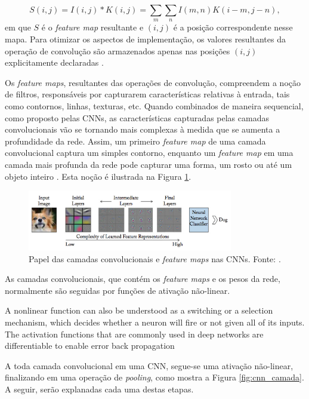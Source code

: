 \begin{equation}
 S(i,j) = I(i,j)*K(i,j) = \sum_{m}\sum_{n}I(m,n)K(i-m,j-n),\label{eq:conv_img}
\end{equation} em que $S$ é o \emph{feature map} resultante e $(i,j)$ é a posição correspondente nesse mapa. Para otimizar os aspectos de implementação, os valores resultantes da operação de convolução são armazenados apenas nas posições $(i,j)$ explicitamente declaradas \cite{goodfellow2016deep}.

Os \emph{feature maps}, resultantes das operações de convolução, compreendem a noção de filtros, responsáveis por capturarem características relativas à entrada, tais como contornos, linhas, texturas, etc. Quando combinados de maneira sequencial, como proposto pelas CNNs, as características capturadas pelas camadas convolucionais vão se tornando mais complexas à medida que se aumenta a profundidade da rede. Assim, um primeiro \emph{feature map} de uma camada convolucional captura um simples contorno, enquanto um \emph{feature map} em uma camada mais profunda da rede pode capturar uma forma, um rosto ou até um objeto inteiro \cite{Buduma:Livro}. Esta noção é ilustrada na Figura \ref{fig:convolutions}.

\begin{figure}[!h]
	\centering
	\caption{Papel das camadas convolucionais e \emph{feature maps} nas CNNs. Fonte: \cite{Khan:Livro}.}
	\label{fig:convolutions}
	\includegraphics[width=0.8\textwidth]{./img/fundamenta/convolutions}
\end{figure}

As camadas convolucionais, que contém os \emph{feature maps} e os pesos da rede, normalmente são seguidas por funções de ativação não-linear.


A nonlinear function can also be understood as a switching or a selection mechanism, which decides whether a neuron will ﬁre or not given all of its inputs. The activation functions that are commonly used in deep networks are diﬀerentiable to enable error back propagation

A toda camada convolucional em uma CNN, segue-se uma ativação não-linear, finalizando em uma operação de \emph{pooling}, como mostra a Figura \ref{fig:cnn_camada}. A seguir, serão explanadas cada uma destas etapas.



